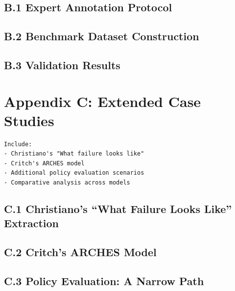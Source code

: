 \documentclass[
  11pt,
  letterpaper,
]{book}
\begin{document}
\subsection*{B.1 Expert Annotation
Protocol}\label{sec-annotation-protocol}

\subsection*{B.2 Benchmark Dataset
Construction}\label{sec-benchmark-construction}

\subsection*{B.3 Validation Results}\label{sec-validation-results}

\section*{Appendix C: Extended Case Studies}\label{sec-appendix-cases}


\begin{verbatim}
Include:
- Christiano's "What failure looks like"
- Critch's ARCHES model
- Additional policy evaluation scenarios
- Comparative analysis across models
\end{verbatim}

\subsection*{C.1 Christiano's ``What Failure Looks Like''
Extraction}\label{sec-christiano-extraction}

\subsection*{C.2 Critch's ARCHES Model}\label{sec-critch-extraction}

\subsection*{C.3 Policy Evaluation: A Narrow
Path}\label{sec-narrow-path-evaluation}
\end{document}
